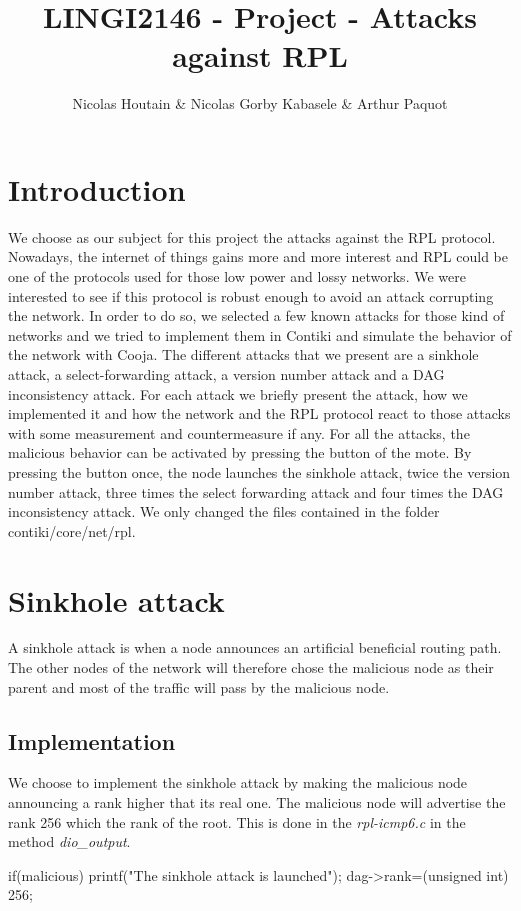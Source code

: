 \documentclass{report}
\title{LINGI2146 - Project - Attacks against RPL}
\author{Nicolas Houtain \& Nicolas Gorby Kabasele \& Arthur Paquot}
\begin{document}
\maketitle
\section{Introduction}
We choose as our subject for this project the attacks against the RPL protocol. Nowadays, the internet of things gains more and more interest and RPL could be one of the protocols used for those low power and lossy networks. We were interested to see if this protocol is robust enough to avoid an attack corrupting the network. In order to do so, we selected a few known attacks for those kind of networks and we tried to implement them in Contiki and simulate the behavior of the network with Cooja. The different attacks that we present are a sinkhole attack, a select-forwarding attack, a version number attack and a DAG inconsistency attack. For each attack we briefly present the attack, how we implemented it and how the network and the RPL protocol react to those attacks with some measurement and countermeasure if any. For all the attacks, the malicious behavior can be activated by pressing the button of the mote. By pressing the button once, the node launches the sinkhole attack, twice the version number attack, three times the select forwarding attack and four times the DAG inconsistency attack. We only changed the files contained in the folder contiki/core/net/rpl.

\section{Sinkhole attack}
A sinkhole attack is when a node announces an artificial beneficial routing path. The other nodes of the network will therefore chose the malicious node as their parent and most of the traffic will pass by the malicious node.
\subsection*{Implementation}
We choose to implement the sinkhole attack by making the malicious node announcing a rank higher that its real one. The malicious node will advertise the rank 256 which the rank of the root. This is done in the \textit{rpl-icmp6.c} in the method \textit{dio\_output}.


\begin{myc}
if(malicious){
	printf("The sinkhole attack is launched\n");
	dag->rank=(unsigned int) 256;
}
\end{myc}
\end{document}
